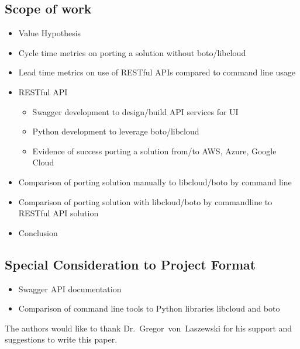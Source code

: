 \subsection{Scope of work}\label{scope-of-work}

\begin{itemize}
\item
  Value Hypothesis
\item
  Cycle time metrics on porting a solution without boto/libcloud
\item
  Lead time metrics on use of RESTful APIs compared to command line
  usage
\item
  RESTful API

  \begin{itemize}
    \item
    Swagger development to design/build API services for UI
  \item
    Python development to leverage boto/libcloud
  \item
    Evidence of success porting a solution from/to AWS, Azure, Google
    Cloud
  \end{itemize}
\item
  Comparison of porting solution manually to libcloud/boto by command
  line
\item
  Comparison of porting solution with libcloud/boto by commandline to
  RESTful API solution
\item
  Conclusion
\end{itemize}

\hypertarget{special-consideration-to-project-format}{%
\subsection{Special Consideration to Project
Format}\label{special-consideration-to-project-format}}

\begin{itemize}
\item
  Swagger API documentation
\item
  Comparison of command line tools to Python libraries libcloud and boto
\end{itemize}

\begin{acks}

  The authors would like to thank Dr.~Gregor~von~Laszewski for his
  support and suggestions to write this paper.

\end{acks}


 

